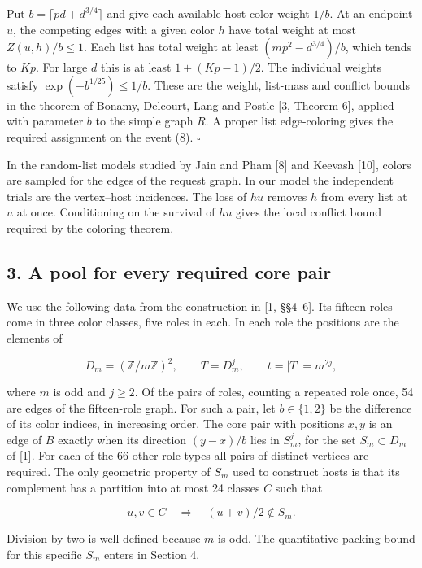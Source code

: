 \documentclass[english,11pt,a4paper]{article}
\begin{document}
Put \(b=\lceil pd+d^{3/4}\rceil\) and give each available host color weight \(1/b\). At an endpoint \(u\), the competing edges with a given color \(h\) have total weight at most \(Z(u,h)/b\le1\). Each list has total weight at least \((mp^2-d^{3/4})/b\), which tends to \(Kp\). For large \(d\) this is at least \(1+(Kp-1)/2\). The individual weights satisfy \(\exp(-b^{1/25})\le1/b\). These are the weight, list-mass and conflict bounds in the theorem of Bonamy, Delcourt, Lang and Postle {[}3, Theorem 6{]}, applied with parameter \(b\) to the simple graph \(R\). A proper list edge-coloring gives the required assignment on the event (8). \(\square\)

In the random-list models studied by Jain and Pham {[}8{]} and Keevash {[}10{]}, colors are sampled for the edges of the request graph. In our model the independent trials are the vertex--host incidences. The loss of \(hu\) removes \(h\) from every list at \(u\) at once. Conditioning on the survival of \(hu\) gives the local conflict bound required by the coloring theorem.

\subsection{3. A pool for every required core pair}\label{a-pool-for-every-required-core-pair}

We use the following data from the construction in {[}1, §§4--6{]}. Its fifteen roles come in three color classes, five roles in each. In each role the positions are the elements of

\[D_m=(\mathbb Z/m\mathbb Z)^2,\qquad T=D_m^j,\qquad t=|T|=m^{2j},\]

where \(m\) is odd and \(j\ge2\). Of the pairs of roles, counting a repeated role once, 54 are edges of the fifteen-role graph. For such a pair, let \(b\in\{1,2\}\) be the difference of its color indices, in increasing order. The core pair with positions \(x,y\) is an edge of \(B\) exactly when its direction \((y-x)/b\) lies in \(S_m^j\), for the set \(S_m\subset D_m\) of {[}1{]}. For each of the 66 other role types all pairs of distinct vertices are required. The only geometric property of \(S_m\) used to construct hosts is that its complement has a partition into at most 24 classes \(C\) such that

\[u,v\in C\quad\Longrightarrow\quad (u+v)/2\notin S_m.
\tag{9}\]

Division by two is well defined because \(m\) is odd. The quantitative packing bound for this specific \(S_m\) enters in Section 4.
\end{document}
